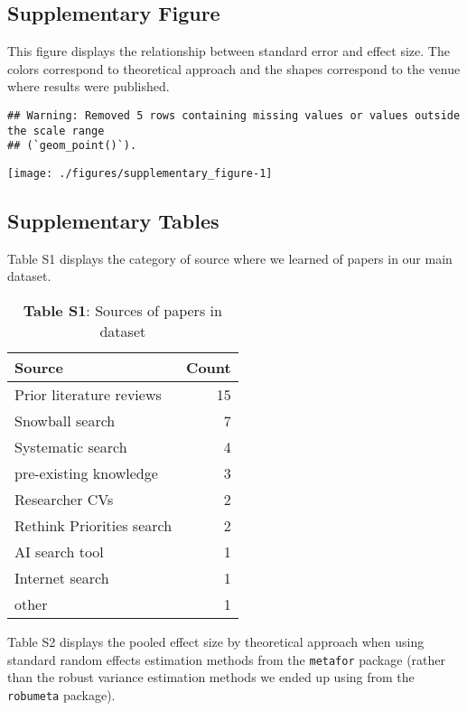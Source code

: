 \documentclass[sn-nature,pdflatex]{sn-jnl}
\begin{document}
\subsection{Supplementary Figure}\label{supplementary-figure}

This figure displays the relationship between standard error and effect
size. The colors correspond to theoretical approach and the shapes
correspond to the venue where results were published.

\begin{verbatim}
## Warning: Removed 5 rows containing missing values or values outside the scale range
## (`geom_point()`).
\end{verbatim}

\texttt{[image: ./figures/supplementary\_figure-1]}

\subsection{Supplementary Tables}\label{supplementary-tables}

Table S1 displays the category of source where we learned of papers in
our main dataset. \captionsetup[table]{labelformat=empty}

\begin{table}[!h]
\centering
\caption{\label{tab:supp_table_one}\textbf{Table S1}: Sources of papers in dataset}
\centering
\begin{tabular}[t]{lr}
\toprule
Source & Count\\
\midrule
Prior literature reviews & 15\\
Snowball search & 7\\
Systematic search & 4\\
pre-existing knowledge & 3\\
Researcher CVs & 2\\
\addlinespace
Rethink Priorities search & 2\\
AI search tool & 1\\
Internet search & 1\\
other & 1\\
\bottomrule
\end{tabular}
\end{table}

Table S2 displays the pooled effect size by theoretical approach when
using standard random effects estimation methods from the
\texttt{metafor} package (rather than the robust variance estimation
methods we ended up using from the \texttt{robumeta} package).
\end{document}
